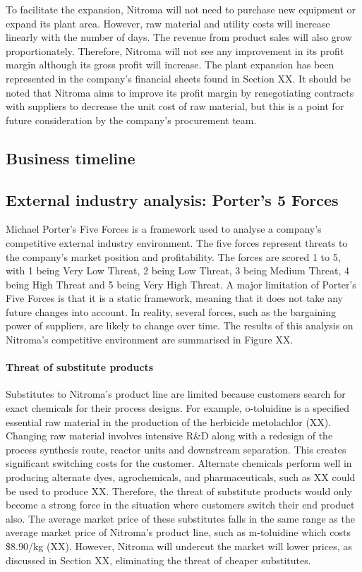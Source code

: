 To facilitate the expansion, Nitroma will not need to purchase new equipment or expand its plant area. However, raw material and utility costs will increase linearly with the number of days. The revenue from product sales will also grow proportionately. Therefore, Nitroma will not see any improvement in its profit margin although its gross profit will increase. The plant expansion has been represented in the company’s financial sheets found in Section XX. It should be noted that Nitroma aims to improve its profit margin by renegotiating contracts with suppliers to decrease the unit cost of raw material, but this is a point for future consideration by the company's procurement team. 

\subsection{Business timeline}
\label{sec:business-timeline}

\subsection{External industry analysis: Porter's 5 Forces}
Michael Porter’s Five Forces is a framework used to analyse a company’s competitive external industry environment. The five forces represent threats to the company’s market position and profitability. The forces are scored 1 to 5, with 1 being Very Low Threat, 2 being Low Threat, 3 being Medium Threat, 4 being High Threat and 5 being Very High Threat. A major limitation of Porter’s Five Forces is that it is a static framework, meaning that it does not take any future changes into account. In reality, several forces, such as the bargaining power of suppliers, are likely to change over time. The results of this analysis on Nitroma’s competitive environment are summarised in Figure XX.

\paragraph{Threat of substitute products}
Substitutes to Nitroma’s product line are limited because customers search for exact chemicals for their process designs. For example, o-toluidine is a specified essential raw material in the production of the herbicide metolachlor (XX). Changing raw material involves intensive R\&D along with a redesign of the process synthesis route, reactor units and downstream separation. This creates significant switching costs for the customer. Alternate chemicals perform well in producing alternate dyes, agrochemicals, and pharmaceuticals, such as XX could be used to produce XX. Therefore, the threat of substitute products would only become a strong force in the situation where customers switch their end product also. The average market price of these substitutes falls in the same range as the average market price of Nitroma’s product line, such as m-toluidine which costs \$8.90/kg (XX). However, Nitroma will undercut the market will lower prices, as discussed in Section XX, eliminating the threat of cheaper substitutes.

